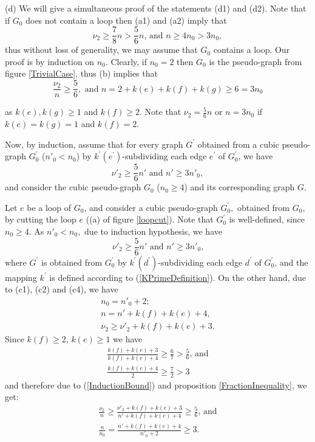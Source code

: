 \documentclass[fleqn,12pt,twoside]{article}
\newenvironment{proof}[1][Proof.]{\begin{trivlist}
\item[\hskip \labelsep {\bfseries #1}]}{\end{trivlist}}
\begin{document}
\begin{proof}
(d) We will give a simultaneous proof of the statements (d1) and
(d2). Note that if $G_{0}$ does not contain a loop then (a1) and
(a2) imply that
\begin{equation*}
\nu _{2}\geq \frac{7}{8}n
>\frac{5}{6}n \text{, and }n \geq 4n_0 >3n_0,
\end{equation*}thus without loss of generality, we may assume that $G_{0}$ contains
a loop. Our proof is by induction on $n_0$. Clearly, if $n_0=2$ then
$G_{0}$ is the pseudo-graph from figure \ref{TrivialCase}, thus (b)
implies that
\begin{equation*}
\frac{\nu _{2}}{n }\geq \frac{5}{6},\text{ and }n =2+k(e)+k(f)+k(g)\geq 6=3n_0
\end{equation*}

as $k(e),k(g)\geq 1$ and $k(f)\geq 2$. Note that $\nu
_{2}=\frac{5}{6}n$ or $n =3n_0$ if $k(e)=k(g)=1$ and $k(f)=2$.

Now, by induction, assume that for every graph $G^{\prime }$
obtained from a cubic pseudo-graph $G_{0}^{\prime }$ ($n'_0 <n_0$)
by $k^{\prime }(e^{\prime }) $-subdividing each edge $e^{\prime }$
of $G_{0}^{\prime }$, we have
\begin{equation*}
\nu' _{2}\geq \frac{5}{6}n' \text{ and }n' \geq 3n'_0,
\end{equation*}and consider the cubic pseudo-graph $G_{0}$ ($n_0 \geq 4$) and its
corresponding graph $G$.

Let $e$ be a loop of $G_{0}$, and consider a cubic pseudo-graph $G_{0}^{\prime },$ obtained from $G_{0},$ by cutting the loop $e$
((a) of figure \ref{loopcut}). Note that $G_{0}^{\prime }$ is
well-defined, since $n_0 \geq 4$. As $n'_0 < n_0,$ due to induction
hypothesis, we have
\begin{equation}
\nu' _{2}\geq \frac{5}{6}n' \text{ and }n' \geq 3n'_0 \text{,}
\label{InductionBound}
\end{equation}where $G^{\prime }$ is obtained from $G_{0}^{\prime }$ by $k^{\prime
}(d^{\prime })$-subdividing each edge $d^{\prime }$ of
$G_{0}^{\prime }$,
and the mapping $k^{\prime }$ is defined according to (\ref{KPrimeDefinition}). On the other hand, due to (c1), (c2) and (c4), we have\begin{gather*}
n_0 =n'_0 +2;
\\
n =n' +k(f)+k(e)+4\text{,} \\
\nu _{2}\geq \nu' _{2}+k(f)+k(e)+3.
\end{gather*}Since $k(f)\geq 2$, $k(e)\geq 1$ we have
\begin{gather*}
\frac{k(f)+k(e)+3}{k(f)+k(e)+4}\geq \frac{6}{7}>\frac{5}{6}\text{, and} \\
\frac{k(f)+k(e)+4}{2}\geq \frac{7}{2}>3
\end{gather*}and therefore due to (\ref{InductionBound}) and proposition \ref {FractionInequality}, we get:
\begin{gather*}
\frac{\nu _{2}}{n}\geq \frac{\nu' _{2}+k(f)+k(e)+3}{n'+k(f)+k(e)+4}\geq \frac{5}{6}\text{, and} \\
\frac{n}{n_0}=\frac{n'+k(f)+k(e)+4}{n'_0+2}\geq 3.
\end{gather*}


\end{proof}
\end{document}
